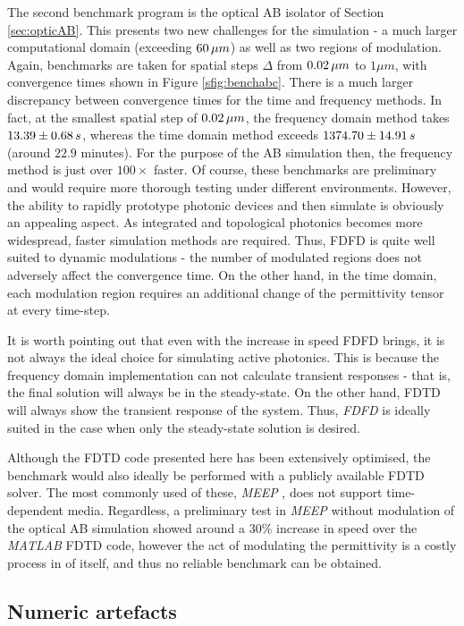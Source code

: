 The second benchmark program is the optical AB isolator of Section \ref{sec:opticAB}. This presents two new challenges for the simulation - a much larger computational domain (exceeding $60  \mskip3mu \mu m$) as well as two regions of modulation. Again, benchmarks are taken for spatial steps $\Delta$ from $0.02  \mskip3mu \mu m$ to $1 \mu m$, with convergence times shown in Figure \ref{sfig:benchabc}. There is a much larger discrepancy between convergence times for the time and frequency methods. In fact, at the smallest spatial step of $0.02  \mskip3mu \mu m$, the frequency domain method takes $13.39 \pm 0.68 \mskip3mu  s$, whereas the time domain method exceeds $1374.70 \pm 14.91  \mskip3mu s$ (around $22.9$ minutes). For the purpose of the AB simulation then, the frequency method is just over $100 \times$ faster. Of course, these benchmarks are preliminary and would require more thorough testing under different environments. However, the ability to rapidly prototype photonic devices and then simulate is obviously an appealing aspect. As integrated and topological photonics becomes more widespread, faster simulation methods are required. Thus, FDFD is quite well suited to dynamic modulations - the number of modulated regions does not adversely affect the convergence time. On the other hand, in the time domain, each modulation region requires an additional change of the permittivity tensor at every time-step.


It is worth pointing out that even with the increase in speed FDFD brings, it is not always the ideal choice for simulating active photonics. This is because the frequency domain implementation can not calculate transient responses - that is, the final solution will always be in the steady-state. On the other hand, FDTD will always show the transient response of the system. Thus, \textit{FDFD} is ideally suited in the case when only the steady-state solution is desired.

Although the FDTD code presented here has been extensively optimised, the benchmark would also ideally be performed with a publicly available FDTD solver. The most commonly used of these, \textit{MEEP}  \cite{Oskooi2010}, does not support time-dependent media. Regardless, a preliminary test in \textit{MEEP} without modulation of the optical AB simulation showed around a $30 \%$ increase in speed over the \textit{MATLAB} FDTD code, however the act of modulating the permittivity is a costly process in of itself, and thus no reliable benchmark can be obtained. 

\subsection{Numeric artefacts}

